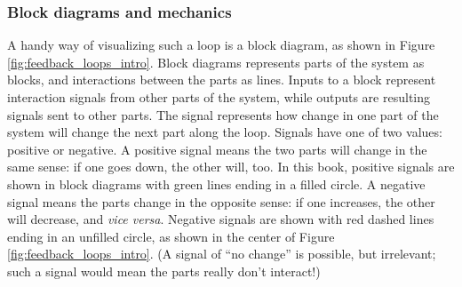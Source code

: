 \documentclass[amstex,12pt]{book}
\begin{document}
\subsubsection{Block diagrams and mechanics}
A handy way of visualizing such a loop is a block diagram, as shown in Figure \ref{fig:feedback_loops_intro}. Block diagrams represents parts of the system as blocks, and interactions between the parts as lines. Inputs to a block represent interaction signals from other parts of the system, while outputs are resulting signals sent to other parts. The signal represents how change in one part of the system will change the next part along the loop. Signals have one of two values: positive or negative. A positive signal means the two parts will change in the same sense: if one goes down, the other will, too. In this book, positive signals are shown in block diagrams with green lines ending in a filled circle. A negative signal means the parts change in the opposite sense: if one increases, the other will decrease, and \textit{vice versa}. Negative signals are shown with red dashed lines ending in an unfilled circle, as shown in the center of Figure \ref{fig:feedback_loops_intro}. (A signal of ``no change'' is possible, but irrelevant; such a signal would mean the parts really don’t interact!) 
\end{document}
